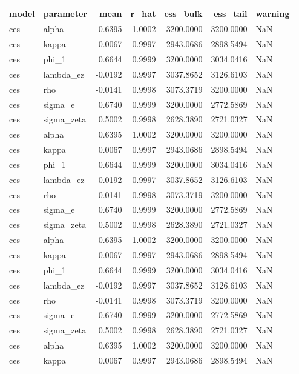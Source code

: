 \begin{tabular}{llrrrrl}
\toprule
model & parameter & mean & r\_hat & ess\_bulk & ess\_tail & warning \\
\midrule
ces & alpha & 0.6395 & 1.0002 & 3200.0000 & 3200.0000 & NaN \\
ces & kappa & 0.0067 & 0.9997 & 2943.0686 & 2898.5494 & NaN \\
ces & phi\_1 & 0.6644 & 0.9999 & 3200.0000 & 3034.0416 & NaN \\
ces & lambda\_ez & -0.0192 & 0.9997 & 3037.8652 & 3126.6103 & NaN \\
ces & rho & -0.0141 & 0.9998 & 3073.3719 & 3200.0000 & NaN \\
ces & sigma\_e & 0.6740 & 0.9999 & 3200.0000 & 2772.5869 & NaN \\
ces & sigma\_zeta & 0.5002 & 0.9998 & 2628.3890 & 2721.0327 & NaN \\
ces & alpha & 0.6395 & 1.0002 & 3200.0000 & 3200.0000 & NaN \\
ces & kappa & 0.0067 & 0.9997 & 2943.0686 & 2898.5494 & NaN \\
ces & phi\_1 & 0.6644 & 0.9999 & 3200.0000 & 3034.0416 & NaN \\
ces & lambda\_ez & -0.0192 & 0.9997 & 3037.8652 & 3126.6103 & NaN \\
ces & rho & -0.0141 & 0.9998 & 3073.3719 & 3200.0000 & NaN \\
ces & sigma\_e & 0.6740 & 0.9999 & 3200.0000 & 2772.5869 & NaN \\
ces & sigma\_zeta & 0.5002 & 0.9998 & 2628.3890 & 2721.0327 & NaN \\
ces & alpha & 0.6395 & 1.0002 & 3200.0000 & 3200.0000 & NaN \\
ces & kappa & 0.0067 & 0.9997 & 2943.0686 & 2898.5494 & NaN \\
ces & phi\_1 & 0.6644 & 0.9999 & 3200.0000 & 3034.0416 & NaN \\
ces & lambda\_ez & -0.0192 & 0.9997 & 3037.8652 & 3126.6103 & NaN \\
ces & rho & -0.0141 & 0.9998 & 3073.3719 & 3200.0000 & NaN \\
ces & sigma\_e & 0.6740 & 0.9999 & 3200.0000 & 2772.5869 & NaN \\
ces & sigma\_zeta & 0.5002 & 0.9998 & 2628.3890 & 2721.0327 & NaN \\
ces & alpha & 0.6395 & 1.0002 & 3200.0000 & 3200.0000 & NaN \\
ces & kappa & 0.0067 & 0.9997 & 2943.0686 & 2898.5494 & NaN \\

\end{tabular}
